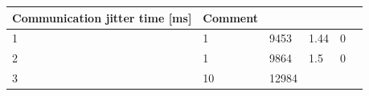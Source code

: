\begin{longtable}[]{@{}llllll@{}}
\begin{minipage}[b]{0.20\columnwidth}
Communication jitter time {[}ms{]}\strut
\end{minipage} & \begin{minipage}[b]{0.09\columnwidth}\raggedright
Comment\strut
\end{minipage}\tabularnewline
\midrule
\endhead
\begin{minipage}[t]{0.02\columnwidth}\raggedright
1\strut
\end{minipage} & \begin{minipage}[t]{0.04\columnwidth}\raggedright
1\strut
\end{minipage} & \begin{minipage}[t]{0.16\columnwidth}\raggedright
9453\strut
\end{minipage} & \begin{minipage}[t]{0.32\columnwidth}\raggedright
1.44\strut
\end{minipage} & \begin{minipage}[t]{0.20\columnwidth}\raggedright
0\strut
\end{minipage} & \begin{minipage}[t]{0.09\columnwidth}\raggedright
\strut
\end{minipage}\tabularnewline
\begin{minipage}[t]{0.02\columnwidth}\raggedright
2\strut
\end{minipage} & \begin{minipage}[t]{0.04\columnwidth}\raggedright
1\strut
\end{minipage} & \begin{minipage}[t]{0.16\columnwidth}\raggedright
9864\strut
\end{minipage} & \begin{minipage}[t]{0.32\columnwidth}\raggedright
1.5\strut
\end{minipage} & \begin{minipage}[t]{0.20\columnwidth}\raggedright
0\strut
\end{minipage} & \begin{minipage}[t]{0.09\columnwidth}\raggedright
\strut
\end{minipage}\tabularnewline
\begin{minipage}[t]{0.02\columnwidth}\raggedright
3\strut
\end{minipage} & \begin{minipage}[t]{0.04\columnwidth}\raggedright
10\strut
\end{minipage} & \begin{minipage}[t]{0.16\columnwidth}\raggedright
12984\strut
\end{minipage} & \begin{minipage}[t]{0.32\columnwidth}\raggedright

\end{minipage}
\end{longtable}
